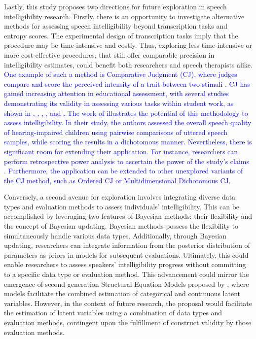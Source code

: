 \documentclass[
  authoryear,
  preprint,
  1p]{elsarticle}
\begin{document}
Lastly, this study proposes two directions for future exploration in
speech intelligibility research. Firstly, there is an opportunity to
investigate alternative methods for assessing speech intelligibility
beyond transcription tasks and entropy scores. The experimental design
of transcription tasks imply that the procedure may be time-intensive
and costly. Thus, exploring less time-intensive or more cost-effective
procedures, that still offer comparable precision in intelligibility
estimates, could benefit both researchers and speech therapists alike.
\textcolor{blue}{One example of such a method is Comparative Judgment (CJ), where judges
compare and score the perceived intensity of a trait between two stimuli
\citep{Thurstone_1927}. CJ has gained increasing attention in
educational assessment, with several studies demonstrating its validity
in assessing various tasks within student work, as shown in
\citet{Pollitt_2012a}, \citet{Pollitt_2012b}, \citet{Lesterhuis_2018},
\citet{vanDaal_2020}, and \citet{Verhavert_et_al_2019}. The work of
\citet{Boonen_et_al_2020} illustrates the potential of this methodology
to assess intelligibility. In their study, the authors assessed the
overall speech quality of hearing-impaired children using pairwise
comparisons of uttered speech samples, while scoring the results in a
dichotomous manner. Nevertheless, there is significant room for
extending their application. For instance, researchers can perform
retrospective power analysis to ascertain the power of the study's
claims \citep[see][pp.~393-394]{Kruschke_2015}. Furthermore, the
application can be extended to other unexplored variants of the CJ
method, such as Ordered CJ \citep{Pritikin_2020} or Multidimensional
Dichotomous CJ.}

Conversely, a second avenue for exploration involves integrating diverse
data types and evaluation methods to assess individuals'
intelligibility. This can be accomplished by leveraging two features of
Bayesian methods: their flexibility and the concept of Bayesian
updating. Bayesian methods possess the flexibility to simultaneously
handle various data types. Additionally, through Bayesian updating,
researchers can integrate information from the posterior distribution of
parameters as priors in models for subsequent evaluations. Ultimately,
this could enable researchers to assess speakers' intelligibility
progress without committing to a specific data type or evaluation
method. This advancement could mirror the emergence of second-generation
Structural Equation Models proposed by \citet{Muthen_2001}, where models
facilitate the combined estimation of categorical and continuous latent
variables. However, in the context of future research, the proposal
would facilitate the estimation of latent variables using a combination
of data types and evaluation methods, contingent upon the fulfillment of
construct validity by those evaluation methods.
\end{document}

